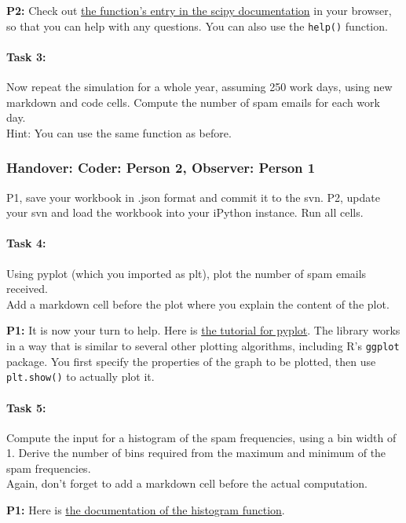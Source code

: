 \documentclass{article}
\begin{document}
\textbf{P2:} Check out \href{http://docs.scipy.org/doc/numpy/reference/generated/numpy.random.binomial.html}{the function's entry in the scipy documentation} in your browser, so that you can help with any questions. You can also use the \texttt{help()} function.


\paragraph{Task 3:} Now repeat the simulation for a whole year, assuming 250 work days, using new markdown and code cells. Compute the number of spam emails for each work day. \\
Hint: You can use the same function as before. 

\subsubsection*{Handover: Coder: Person 2, Observer: Person 1}

P1, save your workbook in .json format and commit it to the svn. P2, update your svn and load the workbook into your iPython instance. Run all cells. 

\paragraph{Task 4:} Using pyplot (which you imported as plt), plot the number of spam emails received.\\
Add a markdown cell before the plot where you explain the content of the plot. 

\textbf{P1:} It is now your turn to help. Here is \href{http://matplotlib.org/users/pyplot_tutorial.html}{the tutorial for pyplot}. The library works in a way that is similar to several other plotting algorithms, including R's \texttt{ggplot} package. You first specify the properties of the graph to be plotted, then use \texttt{plt.show()} to actually plot it. 

\paragraph{Task 5:} Compute the input for a histogram of the spam frequencies, using a bin width of 1. Derive the number of bins required from the maximum and minimum of the spam frequencies.\\
Again, don't forget to add a markdown cell before the actual computation. 

\textbf{P1:} Here is \href{http://docs.scipy.org/doc/numpy/reference/generated/numpy.histogram.html#numpy.histogram}{the documentation of the histogram function}. 
\end{document}
